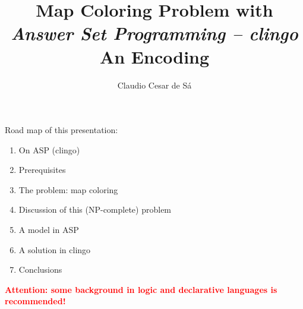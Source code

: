 \documentclass{beamer}
\title[Combinatorial  Optimization] %
{Map Coloring Problem with \\ \textit{Answer Set Programming -- clingo}\\ An Encoding}
\author[Claudio Cesar de Sá] %
{Claudio Cesar de Sá}%
\institute[WhatsTV]{Independent Researcher}
\date[\today] %
\begin{document}
\begin{frame}
  \titlepage
  
\end{frame}








\begin{frame}

\begin{block}{Road map of this presentation:}

\begin{enumerate}

  \item  On ASP (clingo)
  \item  Prerequisites
  \item  The problem: map coloring
  \item  Discussion of this (NP-complete) problem
  \item  A model in ASP
  \item  A solution in clingo
  \item  Conclusions

\end{enumerate}

\end{block}

\pause
\textbf{\textcolor{red}{Attention: some background in logic and declarative languages is recommended!}}


\end{frame}
\end{document}
